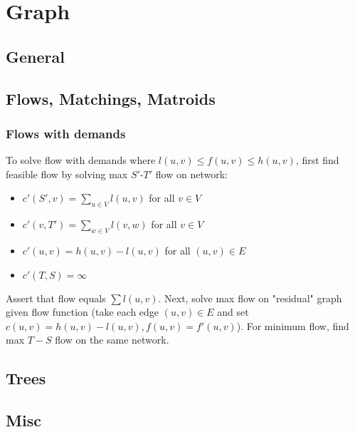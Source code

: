 \chapter{Graph}

\section{General}

\section{Flows, Matchings, Matroids}


	\subsection{Flows with demands}
	To solve flow with demands where $l(u, v) \leq f(u, v) \leq h(u, v)$, 
	first find feasible flow by solving max $S'$-$T'$ flow on network:
	\begin{itemize}[noitemsep,topsep=0pt]
		\item $c'(S',v)=\sum_{u \in V} l(u,v)$ for all $v \in V$
		\item $c'(v, T') = \sum_{w \in V} l(v, w)$ for all $v \in V$
		\item $c'(u, v) = h(u, v) - l(u, v)$ for all $(u, v) \in E$
		\item $c'(T,S)=\infty$
	\end{itemize}
	Assert that flow equals $\sum l(u, v)$. Next, solve max flow 
	on "residual" graph given flow function (take each edge
	$(u, v) \in E$ and set $c(u, v) = h(u, v) - l(u, v), f(u, v) = f'(u, v)$).
	For minimum flow, find max $T-S$ flow on the same network. 



\section{Trees}

\section{Misc}


